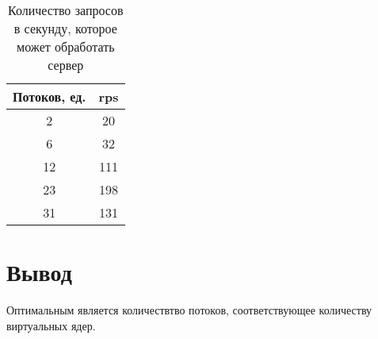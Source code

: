 \begin{table}[h]
	\begin{center}
		\captionsetup{justification=raggedright,singlelinecheck=off}
		\caption{\label{tab:time0}Количество запросов в секунду, которое может обработать сервер}
		\begin{tabular}{|c|c|}
			\hline
			Потоков, ед. & rps\\
			\hline
			2  & 20 \\
			\hline
			6  &32 \\
			\hline
			12  & 111 \\
			\hline
			23  & 198 \\
			\hline
			31  & 131 \\
			\hline
		\end{tabular}
	\end{center}
\end{table}

\pagebreak
\section*{Вывод}

Оптимальным является количествтво потоков, соответствующее количеству виртуальных ядер.
